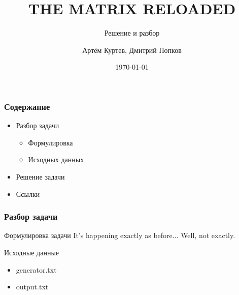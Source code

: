\documentclass{beamer}
\title{THE MATRIX RELOADED}
\subtitle{Решение и разбор}
\author{Артём Куртев, Дмитрий Попков}
\institute{БФУ имени И.Канта}
\date{\today}
\begin{document}
	\begin{frame}
	\titlepage
	\end{frame}
	\begin{frame}
		\frametitle{Содержание}
		\begin{itemize}
			\item Разбор задачи
			\begin{itemize}
				\item Формулировка
				\item Исходных данных
			\end{itemize}
			\item Решение задачи
			\item Ссылки
		\end{itemize}
	\end{frame}
	
	\begin{frame}
		\frametitle{Разбор задачи}
		\begin{block}{Формулировка задачи}
			It's happening exactly as before... Well, not exactly.
		\end{block}
		\begin{block}{Исходные данные}
			\begin{itemize}
				\item generator.txt
				\item output.txt
				
			\end{itemize}
		\end{block}
	\end{frame}
\end{document}
